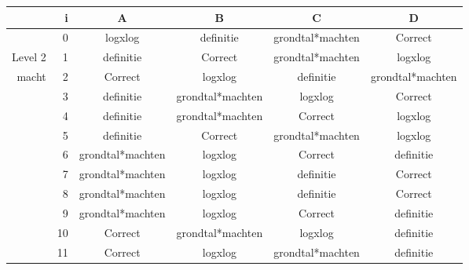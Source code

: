 \begin{tabular}{ rr| c|c|c|c}\hline\hline
     & i & \textbf{A} & \textbf{B} & \textbf{C} & \textbf{D}\\\hline

&0&logxlog&definitie&grondtal*machten&Correct\cellcolor[gray]{0.6}\\
Level 2 & 1&definitie&Correct\cellcolor[gray]{0.6}&grondtal*machten&logxlog\\
macht &2&Correct\cellcolor[gray]{0.6}&logxlog&definitie&grondtal*machten\\
&3&definitie&grondtal*machten&logxlog&Correct\cellcolor[gray]{0.6}\\
&4&definitie&grondtal*machten&Correct\cellcolor[gray]{0.6}&logxlog\\
&5&definitie&Correct\cellcolor[gray]{0.6}&grondtal*machten&logxlog\\
&6&grondtal*machten&logxlog&Correct\cellcolor[gray]{0.6}&definitie\\
&7&grondtal*machten&logxlog&definitie&Correct\cellcolor[gray]{0.6}\\
&8&grondtal*machten&logxlog&definitie&Correct\cellcolor[gray]{0.6}\\
&9&grondtal*machten&logxlog&Correct\cellcolor[gray]{0.6}&definitie\\
&10&Correct\cellcolor[gray]{0.6}&grondtal*machten&logxlog&definitie\\
&11&Correct\cellcolor[gray]{0.6}&logxlog&grondtal*machten&definitie\\
\hline\end{tabular}\par\ \newline

